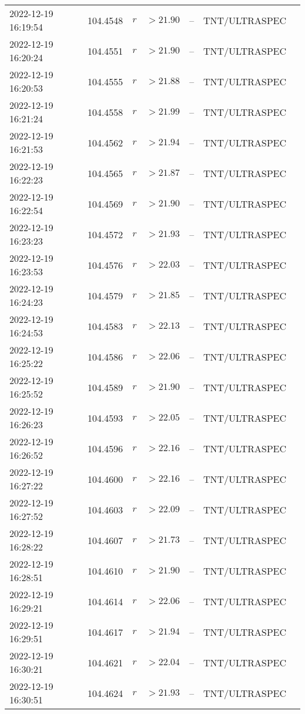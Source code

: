 \documentclass{nature_plusfigure}
\begin{document}
\begin{supplement}
\begin{center}
\begin{longtable}{lllllll}
2022-12-19 16:19:54 & 104.4548 & $r$ & $>21.90$ & -- & TNT/ULTRASPEC &  \\ 
2022-12-19 16:20:24 & 104.4551 & $r$ & $>21.90$ & -- & TNT/ULTRASPEC &  \\ 
2022-12-19 16:20:53 & 104.4555 & $r$ & $>21.88$ & -- & TNT/ULTRASPEC &  \\ 
2022-12-19 16:21:24 & 104.4558 & $r$ & $>21.99$ & -- & TNT/ULTRASPEC &  \\ 
2022-12-19 16:21:53 & 104.4562 & $r$ & $>21.94$ & -- & TNT/ULTRASPEC &  \\ 
2022-12-19 16:22:23 & 104.4565 & $r$ & $>21.87$ & -- & TNT/ULTRASPEC &  \\ 
2022-12-19 16:22:54 & 104.4569 & $r$ & $>21.90$ & -- & TNT/ULTRASPEC &  \\ 
2022-12-19 16:23:23 & 104.4572 & $r$ & $>21.93$ & -- & TNT/ULTRASPEC &  \\ 
2022-12-19 16:23:53 & 104.4576 & $r$ & $>22.03$ & -- & TNT/ULTRASPEC &  \\ 
2022-12-19 16:24:23 & 104.4579 & $r$ & $>21.85$ & -- & TNT/ULTRASPEC &  \\ 
2022-12-19 16:24:53 & 104.4583 & $r$ & $>22.13$ & -- & TNT/ULTRASPEC &  \\ 
2022-12-19 16:25:22 & 104.4586 & $r$ & $>22.06$ & -- & TNT/ULTRASPEC &  \\ 
2022-12-19 16:25:52 & 104.4589 & $r$ & $>21.90$ & -- & TNT/ULTRASPEC &  \\ 
2022-12-19 16:26:23 & 104.4593 & $r$ & $>22.05$ & -- & TNT/ULTRASPEC &  \\ 
2022-12-19 16:26:52 & 104.4596 & $r$ & $>22.16$ & -- & TNT/ULTRASPEC &  \\ 
2022-12-19 16:27:22 & 104.4600 & $r$ & $>22.16$ & -- & TNT/ULTRASPEC &  \\ 
2022-12-19 16:27:52 & 104.4603 & $r$ & $>22.09$ & -- & TNT/ULTRASPEC &  \\ 
2022-12-19 16:28:22 & 104.4607 & $r$ & $>21.73$ & -- & TNT/ULTRASPEC &  \\ 
2022-12-19 16:28:51 & 104.4610 & $r$ & $>21.90$ & -- & TNT/ULTRASPEC &  \\ 
2022-12-19 16:29:21 & 104.4614 & $r$ & $>22.06$ & -- & TNT/ULTRASPEC &  \\ 
2022-12-19 16:29:51 & 104.4617 & $r$ & $>21.94$ & -- & TNT/ULTRASPEC &  \\ 
2022-12-19 16:30:21 & 104.4621 & $r$ & $>22.04$ & -- & TNT/ULTRASPEC &  \\ 
2022-12-19 16:30:51 & 104.4624 & $r$ & $>21.93$ & -- & TNT/ULTRASPEC &  \\ 

\end{longtable}
\end{center}
\end{supplement}
\end{document}
